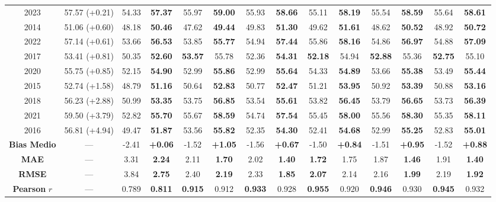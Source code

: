 \begin{table}[H]
\begin{tabular*}{\textwidth}{@{\extracolsep{\fill}} c c cc cc cc cc cc cc @{}}
2023 & 57.57 {\tiny (+0.21)} & 54.33 & \textbf{57.37} & 55.97 & \textbf{59.00} & 55.93 & \textbf{58.66} & 55.11 & \textbf{58.19} & 55.54 & \textbf{58.59} & 55.64 & \textbf{58.61} \\
2014 & 51.06 {\tiny (+0.60)} & 48.18 & \textbf{50.46} & 47.62 & \textbf{49.44} & 49.83 & \textbf{51.30} & 49.62 & \textbf{51.61} & 48.62 & \textbf{50.52} & 48.92 & \textbf{50.72} \\
2022 & 57.14 {\tiny (+0.61)} & 53.66 & \textbf{56.53} & 53.85 & \textbf{55.77} & 54.94 & \textbf{57.44} & 55.86 & \textbf{58.16} & 54.86 & \textbf{56.97} & 54.88 & \textbf{57.09} \\
2017 & 53.41 {\tiny (+0.81)} & 50.35 & \textbf{52.60} & \textbf{53.57} & 55.78 & 52.36 & \textbf{54.31} & \textbf{52.18} & 54.94 & \textbf{52.88} & 55.36 & \textbf{52.75} & 55.10 \\
2020 & 55.75 {\tiny (+0.85)} & 52.15 & \textbf{54.90} & 52.99 & \textbf{55.86} & 52.99 & \textbf{55.64} & 54.33 & \textbf{54.89} & 53.66 & \textbf{55.38} & 53.49 & \textbf{55.44} \\
2015 & 52.74 {\tiny (+1.58)} & 48.79 & \textbf{51.16} & 50.64 & \textbf{52.83} & 50.77 & \textbf{52.47} & 51.21 & \textbf{53.95} & 50.92 & \textbf{53.39} & 50.88 & \textbf{53.16} \\
2018 & 56.23 {\tiny (+2.88)} & 50.99 & \textbf{53.35} & 53.75 & \textbf{56.85} & 53.54 & \textbf{55.61} & 53.82 & \textbf{56.45} & 53.79 & \textbf{56.65} & 53.73 & \textbf{56.39} \\
2021 & 59.50 {\tiny (+3.79)} & 52.82 & \textbf{55.70} & 55.67 & \textbf{58.59} & 54.74 & \textbf{57.54} & 55.45 & \textbf{58.00} & 55.56 & \textbf{58.30} & 55.35 & \textbf{58.11} \\
2016 & 56.81 {\tiny (+4.94)} & 49.47 & \textbf{51.87} & 53.56 & \textbf{55.82} & 52.35 & \textbf{54.30} & 52.41 & \textbf{54.68} & 52.99 & \textbf{55.25} & 52.83 & \textbf{55.01} \\
\midrule
\textbf{Bias Medio} & --- & -2.41 & \textbf{+0.06} & -1.52 & \textbf{+1.05} & -1.56 & \textbf{+0.67} & -1.50 & \textbf{+0.84} & -1.51 & \textbf{+0.95} & -1.52 & \textbf{+0.88} \\
\textbf{MAE} & --- & 3.31 & \textbf{2.24} & 2.11 & \textbf{1.70} & 2.02 & \textbf{1.40} & \textbf{1.72} & 1.75 & 1.87 & \textbf{1.46} & 1.91 & \textbf{1.40} \\
\textbf{RMSE} & --- & 3.84 & \textbf{2.75} & 2.40 & \textbf{2.19} & 2.33 & \textbf{1.85} & \textbf{2.07} & 2.14 & 2.16 & \textbf{1.99} & 2.19 & \textbf{1.92} \\
\textbf{Pearson } $r$ & --- & 0.789 & \textbf{0.811} & \textbf{0.915} & 0.912 & \textbf{0.933} & 0.928 & \textbf{0.955} & 0.920 & \textbf{0.946} & 0.930 & \textbf{0.945} & 0.932 \\
\bottomrule
\end{tabular*}
\end{table}